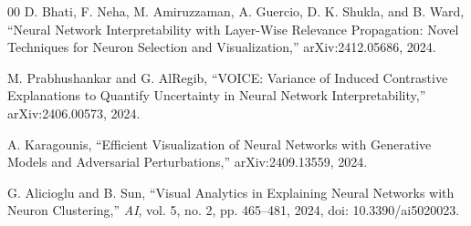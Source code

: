 \documentclass[conference]{IEEEtran}
\begin{document}
\begin{thebibliography}{00}
D. Bhati, F. Neha, M. Amiruzzaman, A. Guercio, D. K. Shukla, and B. Ward,
``Neural Network Interpretability with Layer-Wise Relevance Propagation: Novel Techniques for Neuron Selection and Visualization,''
arXiv:2412.05686, 2024.

M. Prabhushankar and G. AlRegib,
``VOICE: Variance of Induced Contrastive Explanations to Quantify Uncertainty in Neural Network Interpretability,''
arXiv:2406.00573, 2024.

A. Karagounis,
``Efficient Visualization of Neural Networks with Generative Models and Adversarial Perturbations,''
arXiv:2409.13559, 2024.

G. Alicioglu and B. Sun,
``Visual Analytics in Explaining Neural Networks with Neuron Clustering,''
\emph{AI}, vol. 5, no. 2, pp. 465--481, 2024, doi: 10.3390/ai5020023.
\end{thebibliography}
\end{document}
